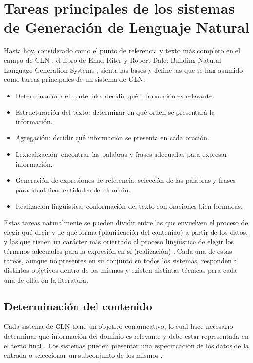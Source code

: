 \section{Tareas principales de los sistemas de Generación de Lenguaje Natural}

    Hasta hoy, considerado como el punto de referencia y texto más completo en el campo de GLN , el libro de Ehud Riter y
Robert Dale: Building Natural Language Generation Systems , sienta las bases y define las que se han asumido como tareas principales 
de un sistema de GLN:

\begin{itemize}
    \item Determinación del contenido: decidir qué información es relevante.
    \item Estructuración del texto: determinar en qué orden se presentará la información.
    \item Agregación: decidir qué información se presenta en cada oración.
    \item Lexicalización: encontrar las palabras y frases adecuadas para expresar información.
    \item Generación de expresiones de referencia: selección de las palabras y frases para identificar entidades del dominio.
    \item Realización lingüística: conformación del texto con oraciones bien formadas.
\end{itemize}


Estas tareas naturalmente se pueden dividir entre las que envuelven el proceso de elegir qué decir y de qué forma (planificación del contenido) 
a partir de los datos, y las que tienen un carácter más orientado al proceso lingüístico de elegir los términos adecuados para la expresión 
en sí (realización) . Cada una de estas tareas, aunque no presentes en su conjunto en todos los sistemas, responden a distintos 
objetivos dentro de los mismos y existen distintas técnicas para cada una de ellas en la literatura.
    
\subsection{Determinación del contenido}\label{subsection:selecciondelcontenido}

    Cada sistema de GLN tiene un objetivo comunicativo, lo cual hace necesario determinar qué información del dominio es relevante y debe 
estar representada en el texto final . Los sistemas pueden presentar una especificación de los datos de la entrada 
o seleccionar un subconjunto de los mismos .


